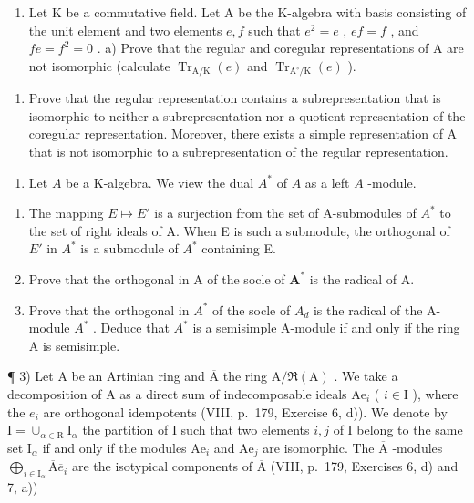
\begin{enumerate}
\def\labelenumi{\arabic{enumi})}
\tightlist
\item
  Let \(\mathrm{K}\) be a commutative field. Let \(\mathrm{A}\) be the K-algebra with basis consisting of the unit element and two elements \(e, f\) such that \(e^2 = e\) , \(ef = f\) , and \(fe = f^2 = 0\) . a) Prove that the regular and coregular representations of \(\mathrm{A}\) are not isomorphic (calculate \(\operatorname{Tr}_{\mathrm{A / K}}(e)\) and \(\operatorname{Tr}_{\mathrm{A}^{\circ} / \mathrm{K}}(e)\) ).
\end{enumerate}

\begin{enumerate}
\def\labelenumi{\alph{enumi})}
\setcounter{enumi}{1}
\tightlist
\item
  Prove that the regular representation contains a subrepresentation that is isomorphic to neither a subrepresentation nor a quotient representation of the coregular representation. Moreover, there exists a simple representation of A that is not isomorphic to a subrepresentation of the regular representation.
\end{enumerate}

\begin{enumerate}
\def\labelenumi{\arabic{enumi})}
\setcounter{enumi}{1}
\tightlist
\item
  Let \(A\) be a K-algebra. We view the dual \(A^*\) of \(A\) as a left \(A\) -module.
\end{enumerate}

\begin{enumerate}
\def\labelenumi{\alph{enumi})}
\item
  The mapping \(E \mapsto E'\) is a surjection from the set of A-submodules of \(A^{*}\) to the set of right ideals of A. When E is such a submodule, the orthogonal of \(E'\) in \(A^{*}\) is a submodule of \(A^{*}\) containing E.
\item
  Prove that the orthogonal in A of the socle of \(\mathbf{A}^*\) is the radical of A.
\item
  Prove that the orthogonal in \(A^{*}\) of the socle of \(A_{d}\) is the radical of the A-module \(A^{*}\) . Deduce that \(A^{*}\) is a semisimple A-module if and only if the ring A is semisimple.
\end{enumerate}

¶ 3) Let A be an Artinian ring and \(\overline{\mathrm{A}}\) the ring \(\mathrm{A} / \Re (\mathrm{A})\) . We take a decomposition of A as a direct sum of indecomposable ideals \(\mathrm{Ae}_i\) ( \(i\in \mathrm{I}\) ), where the \(e_i\) are orthogonal idempotents (VIII, p.~179, Exercise 6, d)). We denote by \(\mathrm{I} = \cup_{\alpha \in \mathrm{R}}\mathrm{I}_{\alpha}\) the partition of I such that two elements \(i,j\) of I belong to the same set \(\mathrm{I}_{\alpha}\) if and only if the modules \(\mathrm{Ae}_i\) and \(\mathrm{Ae}_j\) are isomorphic. The \(\overline{\mathrm{A}}\) -modules \(\bigoplus_{i\in \mathrm{I}_{\alpha}}\overline{\mathrm{A}}\overline{e}_i\) are the isotypical components of \(\overline{\mathrm{A}}\) (VIII, p.~179, Exercises 6, d) and 7, a))

